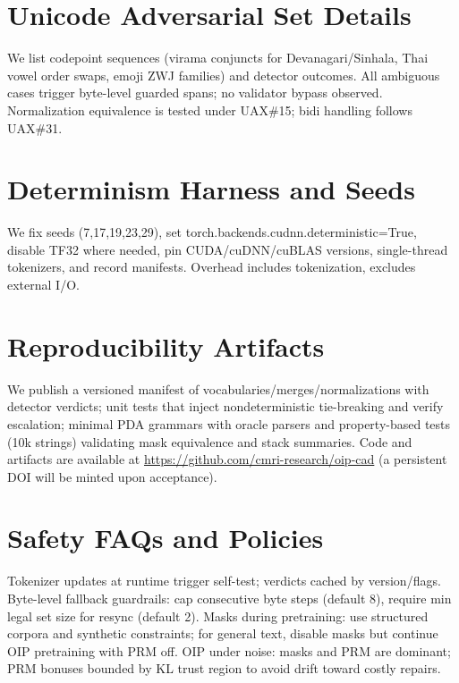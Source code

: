 \documentclass{article}
\begin{document}
\section{Unicode Adversarial Set Details}
We list codepoint sequences (virama conjuncts for Devanagari/Sinhala, Thai vowel order swaps, emoji ZWJ families) and detector outcomes. All ambiguous cases trigger byte-level guarded spans; no validator bypass observed. Normalization equivalence is tested under UAX\#15; bidi handling follows UAX\#31.

\section{Determinism Harness and Seeds}
We fix seeds (7,17,19,23,29), set torch.backends.cudnn.deterministic=True, disable TF32 where needed, pin CUDA/cuDNN/cuBLAS versions, single-thread tokenizers, and record manifests. Overhead includes tokenization, excludes external I/O.

\section{Reproducibility Artifacts}
We publish a versioned manifest of vocabularies/merges/normalizations with detector verdicts; unit tests that inject nondeterministic tie-breaking and verify escalation; minimal PDA grammars with oracle parsers and property-based tests (10k strings) validating mask equivalence and stack summaries. Code and artifacts are available at \url{https://github.com/cmri-research/oip-cad} (a persistent DOI will be minted upon acceptance).

\section{Safety FAQs and Policies}
Tokenizer updates at runtime trigger self-test; verdicts cached by version/flags. Byte-level fallback guardrails: cap consecutive byte steps (default 8), require min legal set size for resync (default 2). Masks during pretraining: use structured corpora and synthetic constraints; for general text, disable masks but continue OIP pretraining with PRM off. OIP under noise: masks and PRM are dominant; PRM bonuses bounded by KL trust region to avoid drift toward costly repairs.
\end{document}
